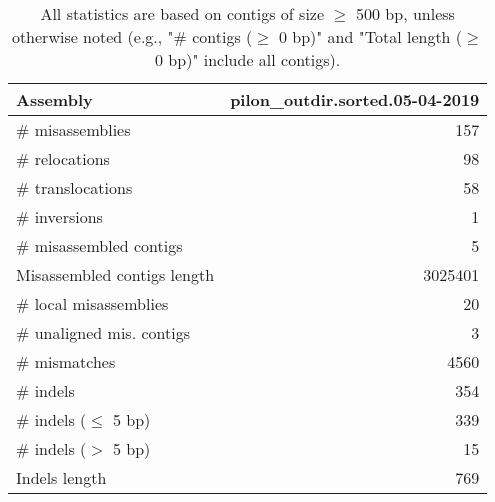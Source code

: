 \documentclass[12pt,a4paper]{article}
\begin{document}
\begin{table}[ht]
\begin{center}
\caption{All statistics are based on contigs of size $\geq$ 500 bp, unless otherwise noted (e.g., "\# contigs ($\geq$ 0 bp)" and "Total length ($\geq$ 0 bp)" include all contigs).}
\begin{tabular}{|l*{1}{|r}|}
\hline
Assembly & pilon\_outdir.sorted.05-04-2019 \\ \hline
\# misassemblies & 157 \\ \hline
\hspace{5mm}\# relocations & 98 \\ \hline
\hspace{5mm}\# translocations & 58 \\ \hline
\hspace{5mm}\# inversions & 1 \\ \hline
\# misassembled contigs & 5 \\ \hline
Misassembled contigs length & 3025401 \\ \hline
\# local misassemblies & 20 \\ \hline
\# unaligned mis. contigs & 3 \\ \hline
\# mismatches & 4560 \\ \hline
\# indels & 354 \\ \hline
\hspace{5mm}\# indels ($\leq$ 5 bp) & 339 \\ \hline
\hspace{5mm}\# indels ($>$ 5 bp) & 15 \\ \hline
Indels length & 769 \\ \hline
\end{tabular}
\end{center}
\end{table}
\end{document}
